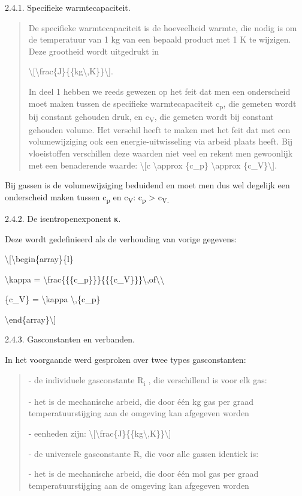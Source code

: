 \documentclass[]{article}
\begin{document}
2.4.1. Specifieke warmtecapaciteit.

\begin{quote}
De specifieke warmtecapaciteit is de hoeveelheid warmte, die nodig is om
de temperatuur van 1 kg van een bepaald product met 1 K te wijzigen.
Deze grootheid wordt uitgedrukt in

\textbackslash{}{[}\textbackslash{}frac\{J\}\{\{kg\textbackslash{},K\}\}\textbackslash{}{]}.

In deel 1 hebben we reeds gewezen op het feit dat men een onderscheid
moet maken tussen de specifieke warmtecapaciteit c\textsubscript{p}, die
gemeten wordt bij constant gehouden druk, en c\textsubscript{V}, die
gemeten wordt bij constant gehouden volume. Het verschil heeft te maken
met het feit dat met een volumewijziging ook een energie-uitwisseling
via arbeid plaats heeft. Bij vloeistoffen verschillen deze waarden niet
veel en rekent men gewoonlijk met een benaderende waarde:
\textbackslash{}{[}c \textbackslash{}approx \{c\_p\}
\textbackslash{}approx \{c\_V\}\textbackslash{}{]}.
\end{quote}

Bij gassen is de volumewijziging beduidend en moet men dus wel degelijk
een onderscheid maken tussen c\textsubscript{p} en c\textsubscript{V}:
c\textsubscript{p} \textgreater{} c\textsubscript{V.}

2.4.2. De isentropenexponent κ.

Deze wordt gedefinieerd als de verhouding van vorige gegevens:

\textbackslash{}{[}\textbackslash{}begin\{array\}\{l\}

\textbackslash{}kappa =
\textbackslash{}frac\{\{\{c\_p\}\}\}\{\{\{c\_V\}\}\}\textbackslash{},of\textbackslash{}\textbackslash{}

\{c\_V\} = \textbackslash{}kappa \textbackslash{},\{c\_p\}

\textbackslash{}end\{array\}\textbackslash{}{]}

2.4.3. Gasconstanten en verbanden.

In het voorgaande werd gesproken over twee types gasconstanten:

\begin{quote}
- de individuele gasconstante R\textsubscript{i} , die verschillend is
voor elk gas:

- het is de mechanische arbeid, die door één kg gas per graad
temperatuurstijging aan de omgeving kan afgegeven worden

- eenheden zijn:
\textbackslash{}{[}\textbackslash{}frac\{J\}\{\{kg\textbackslash{},K\}\}\textbackslash{}{]}

- de universele gasconstante R, die voor alle gassen identiek is:

- het is de mechanische arbeid, die door één mol gas per graad
temperatuurstijging aan de omgeving kan afgegeven worden
\end{quote}
\end{document}
